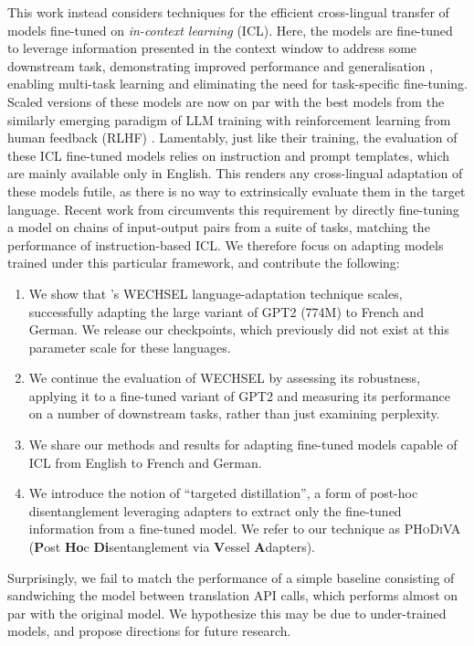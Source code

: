 \documentclass[11pt]{article}
\begin{document}
This work instead considers techniques for the efficient cross-lingual transfer of models fine-tuned
on \textit{in-context learning} (ICL). Here, the models are fine-tuned to leverage information
presented in the context window to address some downstream task, demonstrating improved performance
and generalisation \citep{wei_finetuned_2021,sanh_multitask_2022,wang_benchmarking_2022}, enabling
multi-task learning and eliminating the need for task-specific fine-tuning. Scaled versions of these
models \citep{chung_scaling_2022} are now on par with the best models from the similarly emerging
paradigm of LLM training with reinforcement learning from human feedback (RLHF)
\citep{ouyang_training_2022}. Lamentably, just like their training, the evaluation of these ICL
fine-tuned models relies on instruction and prompt templates, which are mainly available only in
English. This renders any cross-lingual adaptation of these models futile, as there is no way to
extrinsically evaluate them in the target language. Recent work from \citet{min_metaicl_2022}
circumvents this requirement by directly fine-tuning a model on chains of input-output pairs from
a suite of tasks, matching the performance of instruction-based ICL. We therefore focus on adapting
models trained under this particular framework, and contribute the following:
\begin{enumerate}
	\item We show that \citet{minixhofer_wechsel_2022}'s WECHSEL language-adaptation technique scales,
	      successfully adapting the large variant of GPT2 (774M) to French and German. We release our
	      checkpoints, which previously did not exist at this parameter scale for these languages.
	\item We continue the evaluation of WECHSEL by assessing its robustness, applying it to
	      a fine-tuned variant of GPT2 and measuring its performance on a number of downstream tasks,
	      rather than just examining perplexity.
	\item We share our methods and results for adapting fine-tuned models capable of ICL from English to
	      French and German.
	\item We introduce the notion of ``targeted distillation'', a form of post-hoc disentanglement
	      leveraging adapters \citep{houlsby_parameter-efficient_2019} to extract only the fine-tuned
	      information from a fine-tuned model.  We refer to our technique as \textsc{PHoDiVA}
	      (\textbf{P}ost \textbf{Ho}c \textbf{Di}sentanglement via \textbf{V}essel \textbf{A}dapters).
\end{enumerate}
Surprisingly, we fail to match the performance of a simple baseline consisting of sandwiching the
model between translation API calls, which performs almost on par with the original model. We
hypothesize this may be due to under-trained models, and propose directions for future research.
\end{document}
